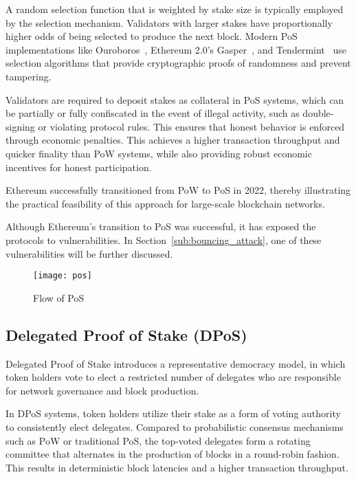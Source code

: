  A random selection function that is weighted by stake size is typically employed by
 the selection mechanism. Validators with larger stakes have proportionally higher odds of being
 selected to produce the next block. Modern PoS implementations like Ouroboros~\cite{ouroboros},
Ethereum 2.0's Gasper~\cite{gasper}, and Tendermint~\cite{tendermint} use selection algorithms
that provide cryptographic proofs of randomness and prevent tampering.

 Validators are required to deposit stakes as collateral in PoS systems, which can be
 partially or fully confiscated in the event of illegal activity, such as double-signing or
 violating protocol rules. This ensures that honest behavior is enforced through economic penalties.
 This achieves a higher transaction throughput and quicker finality than PoW systems, while also
 providing robust economic incentives for honest participation.

 Ethereum successfully transitioned from PoW to PoS in 2022, thereby illustrating the
 practical feasibility of this approach for large-scale blockchain networks. 

 Although Ethereum's transition to PoS was successful, it has exposed the
 protocols to vulnerabilities. In Section~\ref{sub:bouncing_attack}, one of these
 vulnerabilities will be further discussed.

\begin{figure}[h]
	\centering
	\texttt{[image: pos]}
	\caption{Flow of PoS}
	\label{fig:pos}
\end{figure}


\subsection{Delegated Proof of Stake (DPoS)}\label{sub:dpos}

Delegated Proof of Stake introduces a representative democracy model,
in which token holders vote to elect a restricted number of delegates who are
responsible for network governance and block production.

In DPoS systems, token holders utilize their stake as a form of
voting authority to consistently elect delegates.
Compared to probabilistic consensus mechanisms such as PoW or traditional PoS, 
the top-voted delegates form a rotating committee that alternates in the production of blocks
in a round-robin fashion. This results in deterministic block latencies and a higher transaction throughput.

